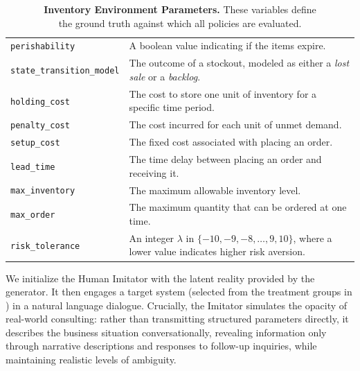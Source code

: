 \begin{description}
\begin{table}[!ht]
\begin{tabular}{
        >{\raggedright\arraybackslash}p{}
        >{\raggedright\arraybackslash}p{}
    }
        \texttt{perishability} &
        A boolean value indicating if the items expire. \\

        \texttt{state\_transition\_model} &
        The outcome of a stockout, modeled as either a \textit{lost sale} or a \textit{backlog}. \\

        \texttt{holding\_cost} &
        The cost to store one unit of inventory for a specific time period. \\

        \texttt{penalty\_cost} &
        The cost incurred for each unit of unmet demand. \\

        \texttt{setup\_cost} &
        The fixed cost associated with placing an order. \\

        \texttt{lead\_time} &
        The time delay between placing an order and receiving it. \\

        \texttt{max\_inventory} &
        The maximum allowable inventory level. \\

        \texttt{max\_order} &
        The maximum quantity that can be ordered at one time. \\

        \texttt{risk\_tolerance} &
        An integer $\lambda$ in $\{ -10,-9, -8, \ldots, 9, 10\}$, where a lower value indicates higher risk aversion. \\
        \bottomrule
    \end{tabular}
    \caption{\textbf{Inventory Environment Parameters.} These variables define \\ the ground truth against which all policies are evaluated.}
    \label{tab:param-definitions}
\end{table}

    
    \item[2. Interaction:]
    We initialize the Human Imitator with the latent reality provided by the generator. It then engages a target system (selected from the treatment groups in ) in a natural language dialogue. Crucially, the Imitator simulates the opacity of real-world consulting: rather than transmitting structured parameters directly, it describes the business situation conversationally, revealing information only through narrative descriptions and responses to follow-up inquiries, while maintaining realistic levels of ambiguity.
    

\end{description}

